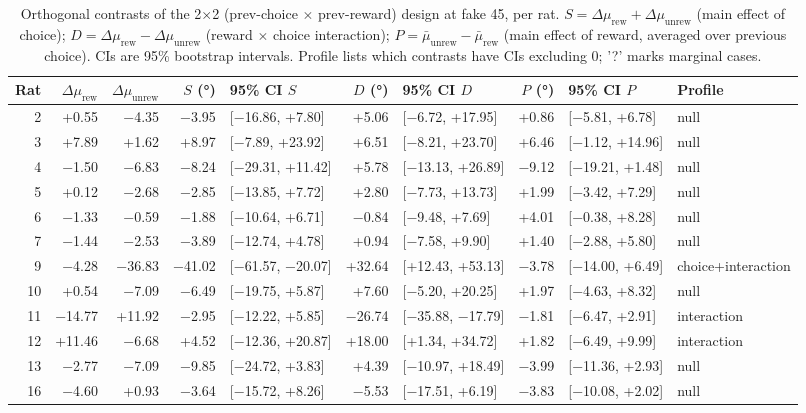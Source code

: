 \begin{table}[htbp]
  \centering
  \caption{Orthogonal contrasts of the 2$\times$2 (prev-choice $\times$ prev-reward) design at fake 45\textdegree, per rat. $S = \Delta\mu_{\mathrm{rew}} + \Delta\mu_{\mathrm{unrew}}$ (main effect of choice); $D = \Delta\mu_{\mathrm{rew}} - \Delta\mu_{\mathrm{unrew}}$ (reward $\times$ choice interaction); $P = \bar\mu_{\mathrm{unrew}} - \bar\mu_{\mathrm{rew}}$ (main effect of reward, averaged over previous choice). CIs are 95\% bootstrap intervals. Profile lists which contrasts have CIs excluding 0; '?' marks marginal cases.}
  \label{tab:orthogonal_contrasts}
  \begin{tabular}{rrrrlrlrll}
    \toprule
    Rat & $\Delta\mu_{\mathrm{rew}}$ & $\Delta\mu_{\mathrm{unrew}}$ & $S$ (°) & 95\% CI $S$ & $D$ (°) & 95\% CI $D$ & $P$ (°) & 95\% CI $P$ & Profile \\
    \midrule
    2 & +0.55 & −4.35 & −3.95 & [−16.86, +7.80] & +5.06 & [−6.72, +17.95] & +0.86 & [−5.81, +6.78] & null \\
    3 & +7.89 & +1.62 & +8.97 & [−7.89, +23.92] & +6.51 & [−8.21, +23.70] & +6.46 & [−1.12, +14.96] & null \\
    4 & −1.50 & −6.83 & −8.24 & [−29.31, +11.42] & +5.78 & [−13.13, +26.89] & −9.12 & [−19.21, +1.48] & null \\
    5 & +0.12 & −2.68 & −2.85 & [−13.85, +7.72] & +2.80 & [−7.73, +13.73] & +1.99 & [−3.42, +7.29] & null \\
    6 & −1.33 & −0.59 & −1.88 & [−10.64, +6.71] & −0.84 & [−9.48, +7.69] & +4.01 & [−0.38, +8.28] & null \\
    7 & −1.44 & −2.53 & −3.89 & [−12.74, +4.78] & +0.94 & [−7.58, +9.90] & +1.40 & [−2.88, +5.80] & null \\
    9 & −4.28 & −36.83 & −41.02 & [−61.57, −20.07] & +32.64 & [+12.43, +53.13] & −3.78 & [−14.00, +6.49] & choice+interaction \\
    10 & +0.54 & −7.09 & −6.49 & [−19.75, +5.87] & +7.60 & [−5.20, +20.25] & +1.97 & [−4.63, +8.32] & null \\
    11 & −14.77 & +11.92 & −2.95 & [−12.22, +5.85] & −26.74 & [−35.88, −17.79] & −1.81 & [−6.47, +2.91] & interaction \\
    12 & +11.46 & −6.68 & +4.52 & [−12.36, +20.87] & +18.00 & [+1.34, +34.72] & +1.82 & [−6.49, +9.99] & interaction \\
    13 & −2.77 & −7.09 & −9.85 & [−24.72, +3.83] & +4.39 & [−10.97, +18.49] & −3.99 & [−11.36, +2.93] & null \\
    16 & −4.60 & +0.93 & −3.64 & [−15.72, +8.26] & −5.53 & [−17.51, +6.19] & −3.83 & [−10.08, +2.02] & null \\
    \bottomrule
  \end{tabular}
\end{table}
